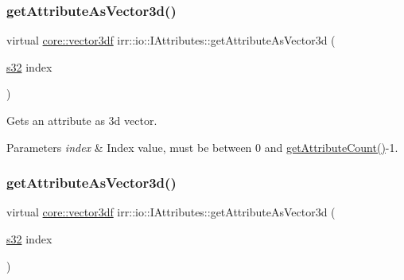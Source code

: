 \subsubsection{\texorpdfstring{get\+Attribute\+As\+Vector3d()}{getAttributeAsVector3d()}\hspace{0.1cm}{\footnotesize\ttfamily [3/4]}}
{\footnotesize\ttfamily virtual \hyperlink{namespaceirr_1_1core_ae6e2b2a6c552833ebbd5b7463d03586b}{core\+::vector3df} irr\+::io\+::\+I\+Attributes\+::get\+Attribute\+As\+Vector3d (\begin{DoxyParamCaption}\item[{\hyperlink{namespaceirr_ac66849b7a6ed16e30ebede579f9b47c6}{s32}}]{index }\end{DoxyParamCaption})\hspace{0.3cm}{\ttfamily [pure virtual]}}



Gets an attribute as 3d vector. 


\begin{DoxyParams}{Parameters}
{\em index} & Index value, must be between 0 and \hyperlink{classirr_1_1io_1_1IAttributes_a796bdd9440ee7ba0b6742a90a82870b6}{get\+Attribute\+Count()}-\/1. \\
\hline
\end{DoxyParams}
\mbox{\label{classirr_1_1io_1_1IAttributes_a7ff94072381cac9912d73c9c6c77c6ce}} 
\subsubsection{\texorpdfstring{get\+Attribute\+As\+Vector3d()}{getAttributeAsVector3d()}\hspace{0.1cm}{\footnotesize\ttfamily [4/4]}}
{\footnotesize\ttfamily virtual \hyperlink{namespaceirr_1_1core_ae6e2b2a6c552833ebbd5b7463d03586b}{core\+::vector3df} irr\+::io\+::\+I\+Attributes\+::get\+Attribute\+As\+Vector3d (\begin{DoxyParamCaption}\item[{\hyperlink{namespaceirr_ac66849b7a6ed16e30ebede579f9b47c6}{s32}}]{index }\end{DoxyParamCaption})\hspace{0.3cm}{\ttfamily [pure virtual]}}



